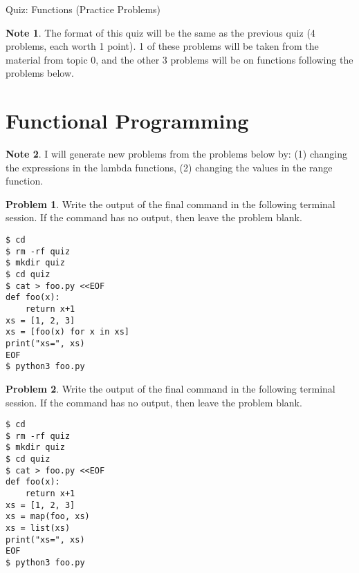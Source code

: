 \documentclass[10pt]{article}
\theoremstyle{definition}
\newtheorem{problem}{Problem}
\newtheorem{note}{Note}
\begin{document}
\begin{center}
    {
\Large
    Quiz: Functions (Practice Problems)
}

    \vspace{0.1in}
\end{center}

\vspace{0.15in}
\noindent
\begin{note}
The format of this quiz will be the same as the previous quiz (4 problems, each worth 1 point).
1 of these problems will be taken from the material from topic 0,
and the other 3 problems will be on functions following the problems below.
\end{note}
\vspace{0.15in}

\section{Functional Programming}
\begin{note}
    I will generate new problems from the problems below by: (1) changing the expressions in the lambda functions, (2) changing the values in the range function.
\end{note}
\vspace{0.15in}

\begin{problem}
    Write the output of the final command in the following terminal session.
    If the command has no output, then leave the problem blank.
\end{problem}
\begin{lstlisting}
$ cd
$ rm -rf quiz
$ mkdir quiz
$ cd quiz
$ cat > foo.py <<EOF
def foo(x):
    return x+1
xs = [1, 2, 3]
xs = [foo(x) for x in xs]
print("xs=", xs)
EOF
$ python3 foo.py
\end{lstlisting}
\vspace{0.4in}

\begin{problem}
    Write the output of the final command in the following terminal session.
    If the command has no output, then leave the problem blank.
\end{problem}
\begin{lstlisting}
$ cd
$ rm -rf quiz
$ mkdir quiz
$ cd quiz
$ cat > foo.py <<EOF
def foo(x):
    return x+1
xs = [1, 2, 3]
xs = map(foo, xs)
xs = list(xs)
print("xs=", xs)
EOF
$ python3 foo.py
\end{lstlisting}
\vspace{0.4in}
\end{document}
